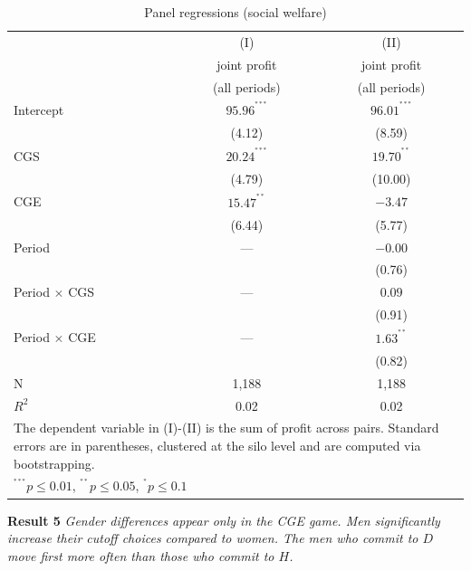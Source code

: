 \documentclass[12pt, letterpaper]{article}
\theoremstyle{plain}
\begin{document}
\begin{table}[ht]
\centering
\caption{Panel regressions (social welfare)}
\footnotesize
\begin{tabular}{lcc}
\hline
  & (I) & (II)  \\
&  joint profit   & joint profit  \\
&  (all periods)   & (all periods) \\
    \hline
Intercept & $95.96^{^{***}}$  &$ 96.01^{^{***}}$ \\
& (4.12) & (8.59)  \\
CGS &  $20.24^{^{***}}$  & $ 19.70^{^{**}}$ \\
& (4.79)  & (10.00)  \\
CGE &  $15.47^{^{**}}$ & $-3.47$  \\
& (6.44)   & (5.77)  \\
Period & ---&$-0.00$ \\
&  & (0.76)\\
Period $\times$ CGS & ---&$0.09$ \\
&  & (0.91)   \\
Period $\times$ CGE & ---&$1.63^{^{**}}$\\
&  & (0.82)  \\

\hline
N & 1,188  & 1,188 \\ 
$R^2$ & 0.02  & 0.02  \\
\hline
\hline
 \multicolumn{3}{p{.7\textwidth}}{\scriptsize{The dependent variable in (I)-(II) is the sum of profit across pairs. Standard errors are in parentheses, clustered at the silo level and are computed via bootstrapping.}}\\ 
 \multicolumn{3}{p{0.4\textwidth}}{\scriptsize{ $^{^{***}}p\leq0.01$,
    $^{^{**}}p\leq0.05$, $^{^{*}}p\leq0.1$}} \\
\end{tabular}
\label{table:ols_jointprofit}
\end{table}

\noindent \textbf{Result 5}
\textit{Gender differences appear only in the CGE game. Men significantly increase their cutoff choices compared to women. The men who commit to $D$ move first more often than those who commit to $H$.}\\



\end{document}
